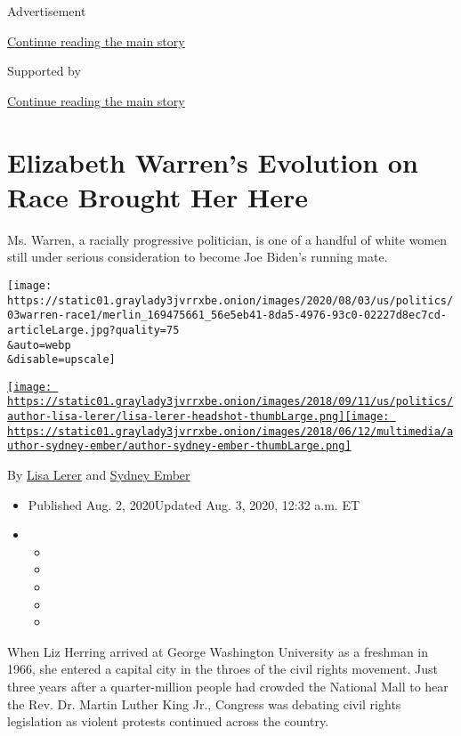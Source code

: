 Advertisement

\protect\hyperlink{after-top}{Continue reading the main story}

Supported by

\protect\hyperlink{after-sponsor}{Continue reading the main story}

\hypertarget{elizabeth-warrens-evolution-on-race-brought-her-here}{%
\section{Elizabeth Warren's Evolution on Race Brought Her
Here}\label{elizabeth-warrens-evolution-on-race-brought-her-here}}

Ms. Warren, a racially progressive politician, is one of a handful of
white women still under serious consideration to become Joe Biden's
running mate.

\texttt{[image: https://static01.graylady3jvrrxbe.onion/images/2020/08/03/us/politics/03warren-race1/merlin\_169475661\_56e5eb41-8da5-4976-93c0-02227d8ec7cd-articleLarge.jpg?quality=75\\\&auto=webp\\\&disable=upscale]}

\href{https://www.nytimes3xbfgragh.onion/by/lisa-lerer}{\texttt{[image: https://static01.graylady3jvrrxbe.onion/images/2018/09/11/us/politics/author-lisa-lerer/lisa-lerer-headshot-thumbLarge.png]}}\href{https://www.nytimes3xbfgragh.onion/by/sydney-ember}{\texttt{[image: https://static01.graylady3jvrrxbe.onion/images/2018/06/12/multimedia/author-sydney-ember/author-sydney-ember-thumbLarge.png]}}

By \href{https://www.nytimes3xbfgragh.onion/by/lisa-lerer}{Lisa Lerer}
and \href{https://www.nytimes3xbfgragh.onion/by/sydney-ember}{Sydney
Ember}

\begin{itemize}
\item
  Published Aug. 2, 2020Updated Aug. 3, 2020, 12:32 a.m. ET
\item
  \begin{itemize}
  \item
  \item
  \item
  \item
  \item
  \end{itemize}
\end{itemize}

When Liz Herring arrived at George Washington University as a freshman
in 1966, she entered a capital city in the throes of the civil rights
movement. Just three years after a quarter-million people had crowded
the National Mall to hear the Rev. Dr. Martin Luther King Jr., Congress
was debating civil rights legislation as violent protests continued
across the country.

